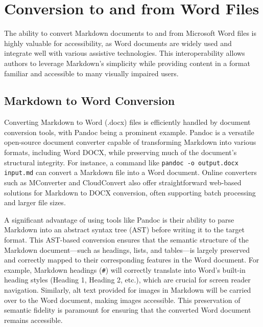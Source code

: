 \section{Conversion to and from Word Files}
\label{sec:markdown-word}

The ability to convert Markdown documents to and from Microsoft Word files is highly valuable for accessibility, as Word documents are widely used and integrate well with various assistive technologies. This interoperability allows authors to leverage Markdown's simplicity while providing content in a format familiar and accessible to many visually impaired users.

\subsection{Markdown to Word Conversion}
Converting Markdown to Word (.docx) files is efficiently handled by document conversion tools, with Pandoc being a prominent example.\cite{AllThingsOpenPandoc}\cite{PandocManual} Pandoc is a versatile open-source document converter capable of transforming Markdown into various formats, including Word DOCX, while preserving much of the document's structural integrity.\cite{AllThingsOpenPandoc}\cite{PandocManual} For instance, a command like \texttt{pandoc -o output.docx input.md} can convert a Markdown file into a Word document.\cite{AllThingsOpenPandoc} Online converters such as MConverter and CloudConvert also offer straightforward web-based solutions for Markdown to DOCX conversion, often supporting batch processing and larger file sizes.\cite{MConverter}\cite{CloudConvert}

A significant advantage of using tools like Pandoc is their ability to parse Markdown into an abstract syntax tree (AST) before writing it to the target format.\cite{PandocLuaFilters,PandocManual} This AST-based conversion ensures that the semantic structure of the Markdown document---such as headings, lists, and tables---is largely preserved and correctly mapped to their corresponding features in the Word document.\cite{PandocLuaFilters,PandocManual} For example, Markdown headings (\texttt{\#}) will correctly translate into Word's built-in heading styles (Heading 1, Heading 2, etc.), which are crucial for screen reader navigation.\cite{DSU,CreateUW} Similarly, alt text provided for images in Markdown will be carried over to the Word document, making images accessible.\cite{PandocLuaFilters} This preservation of semantic fidelity is paramount for ensuring that the converted Word document remains accessible.


